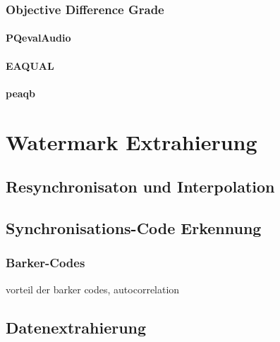 \subsubsection{Objective Difference Grade}

\paragraph{PQevalAudio}

\paragraph{EAQUAL}

\paragraph{peaqb}


\section{Watermark Extrahierung}


\subsection{Resynchronisaton und Interpolation}

\subsection{Synchronisations-Code Erkennung}

\subsubsection{Barker-Codes}

vorteil der barker codes, autocorrelation

\subsection{Datenextrahierung}



